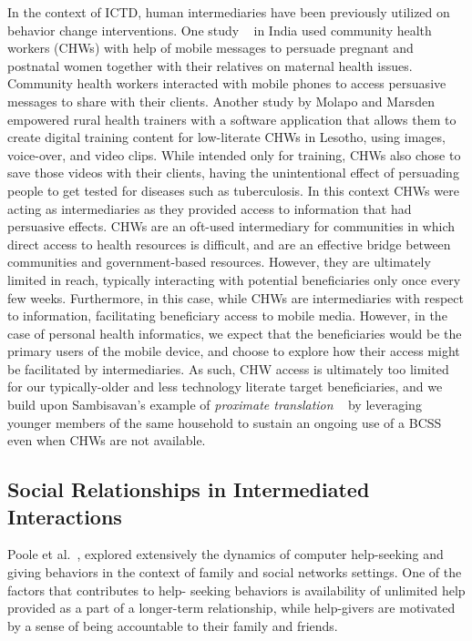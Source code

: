 \documentclass{sig-alternate}
\begin{document}
In the context of ICTD, human intermediaries have been previously utilized on
behavior change interventions. One study
~\cite{ramachandran2010mobile,ramachandran2010research} in India used community
health workers (CHWs) with help of mobile messages to persuade pregnant and postnatal
women together with their relatives on maternal health issues.  Community
health workers interacted with mobile phones to access persuasive messages to
share with their clients. Another study by Molapo and Marsden
~\cite{molapo2013software}  empowered rural health trainers with a software
application that allows them to create digital  training  content  for 
low-literate 
CHWs in Lesotho, using images, voice-over, and  video clips.
While intended only for training, CHWs also chose to save those videos with their 
clients, having the unintentional
effect of persuading people to get tested for diseases such as
tuberculosis. In this context CHWs were acting as intermediaries as they
provided access to information that had persuasive effects. 
CHWs are an oft-used intermediary for communities in which direct access to 
health resources is difficult, and are an effective bridge between communities
and government-based resources.  However, they are ultimately limited in reach,
typically interacting with potential beneficiaries only once every few weeks.
Furthermore, in this case, while CHWs are intermediaries with respect to 
information, facilitating beneficiary access to mobile media.  However, in the
case of personal health informatics, we expect that the beneficiaries would
be the primary users of the mobile device, and choose to explore how their
access might be facilitated by intermediaries.  As such, CHW access is 
ultimately too limited for our typically-older and less technology literate
target beneficiaries, and we build upon Sambisavan's example of {\em{proximate translation}} ~\cite{sambasivan2010} by leveraging younger members of the same household to sustain an ongoing use of a BCSS even when CHWs are not available.


\subsection{Social Relationships in Intermediated Interactions}

Poole et al.~\cite{poole:chh}, explored extensively the dynamics of computer
help-seeking and giving behaviors in the context of family and social networks
settings. One of the factors that contributes to help-
seeking behaviors is availability of unlimited help provided as a part of a
longer-term relationship, while  help-givers are motivated by a sense
of being accountable to their family and friends.
\end{document}
